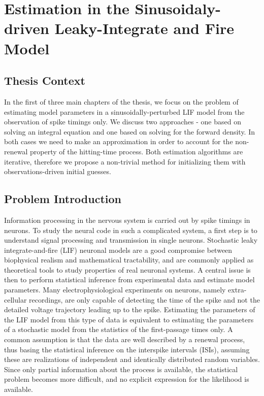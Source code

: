 \chapter{Estimation in the Sinusoidaly-driven Leaky-Integrate and Fire Model}
\label{ch:estimate}
\graphicspath{{../LIFEPaper/}}

   
\section{Thesis Context}
 In the first of three main chapters of the thesis, we focus on the problem of
 estimating model parameters in a sinusoidally-perturbed LIF model from the
 observation of spike timings only. We discuss two approaches - one based on
 solving an integral equation and one based on solving for the forward density.
 In both cases we need to make an approximation in order to account for the
 non-renewal property of the hitting-time process. 
Both estimation algorithms are iterative, therefore we propose a non-trivial
 method for initializing them with observations-driven initial guesses.  
 
\section{Problem Introduction} 
Information processing in the nervous system is carried out by spike timings in
neurons. To study the neural code in such a complicated system, a first step is
to understand signal processing and transmission in single neurons. Stochastic
leaky integrate-and-fire (LIF) neuronal models are a good compromise between
biophysical realism and mathematical tractability, and are commonly applied as
theoretical tools to study properties of real neuronal systems. A central issue
is then to perform statistical inference from experimental data and estimate
model parameters. Many electrophysiological experiments on neurons, namely
extra-cellular recordings, are only capable of detecting the time of the spike
and not the detailed voltage trajectory leading up to the spike. Estimating the
parameters of the LIF model from this type of data is equivalent to estimating
the parameters of a stochastic model from the statistics of the first-passage
times only. A common assumption is that the data are well described by a renewal
process, thus basing the statistical inference on the interspike intervals
(ISIs), assuming these are realizations of independent and identically
distributed random variables. Since only partial information about the process
is available, the statistical problem becomes more difficult, and no explicit
expression for the likelihood is available. 

